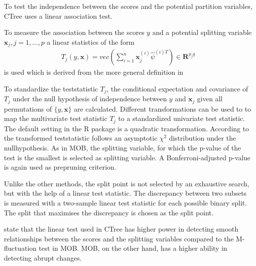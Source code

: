 To test the independence between the scores and the potential partition variables, CTree uses a linear association test.

To measure the association between the scores $y$ and a potential splitting variable $\textbf{x}_{j}, j = 1,...,p$ a linear statistics of the form 
\begin{align}
    T_{j}(y,\textbf{x}) = vec\left(\sum_{i=1}^n \textbf{x}_j^{(i)}\hat{\psi}^{(i)T}\right) \in \mathbf{R}^{p_{j} q}
\end{align}
is used which is derived from the more general definition in \citep{Hothorn.2006}

To standardize the teststatistic $T_{j}$, the conditional expectation and covariance of $T_{j}$ under the null hypothesis of independence between $y$ and $\textbf{x}_j$ given all permutations of $\{y,\textbf{x}\}$ are calculated.
Different transformations can be used to to map the multivariate test statistic $T_{j}$ to a standardized univariate test statistic. The default setting in the R package \citep{Hothorn.2015b} is a quadratic transformation. According to  \citep{Hothorn.2006} the transformed teststatistic follows an asymptotic $\chi^2$ distribution under the nullhypothesis.
As in MOB, the splitting variable, for which the p-value of the test is the smallest is selected as splitting variable. A Bonferroni-adjusted p-value is again used as prepruning criterion.



Unlike the other methods, the split point is not selected by an exhaustive search, but with the help of a linear test statistic. The discrepancy between two subsets is measured with a two-sample linear test statistic for each possible binary split. The split that maximises the discrepancy is chosen as the split point. \citep{Hothorn.2006}

\citep{Schlosser.2019} state that the linear test used in CTree has higher power in detecting smooth relationships between the scores and the splitting variables compared to the M-fluctuation test in MOB. MOB, on the other hand, has a higher ability in detecting abrupt changes.


